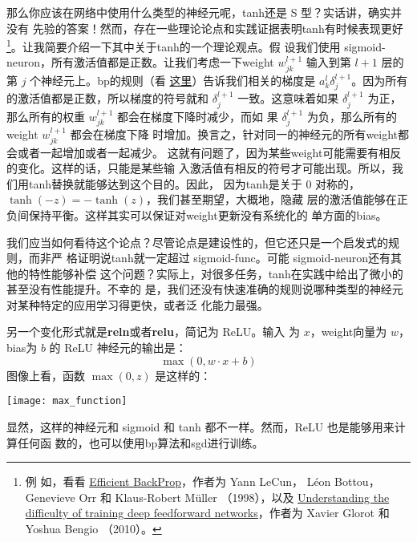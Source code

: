 那么你应该在网络中使用什么类型的神经元呢，\gls*{tanh}还是 S 型？实话讲，确实并没有
先验的答案！然而，存在一些理论论点和实践证据表明\gls*{tanh}有时候表现更好\footnote{例
  如，看看 \href{http://yann.lecun.com/exdb/publis/pdf/lecun-98b.pdf}{Efficient
    BackProp}，作者为 Yann LeCun， Léon Bottou， Genevieve Orr 和 Klaus-Robert
  Müller （1998），以及
  \href{http://jmlr.org/proceedings/papers/v9/glorot10a/glorot10a.pdf}{Understanding
    the difficulty of training deep feedforward networks}，作者为 Xavier Glorot
  和 Yoshua Bengio （2010）。}。让我简要介绍一下其中关于\gls*{tanh}的一个理论观点。假
设我们使用 \gls*{sigmoid-neuron}，所有激活值都是正数。让我们考虑一下\gls*{weight}
$w_{jk}^{l+1}$ 输入到第 $l+1$ 层的第 $j$ 个神经元上。\gls*{bp}的规则（看%
  \hyperref[eq:bp4]{这里}）告诉我们相关的梯度是 $a_k^l\delta_j^{l+1}$。因为所有
的激活值都是正数，所以梯度的符号就和 $\delta_j^{l+1}$ 一致。这意味着如果
$\delta_j^{l+1}$ 为正，那么所有的权重 $w_{jk}^{l+1}$ 都会在梯度下降时减少，而如
果 $\delta_j^{l+1}$ 为负，那么所有的\gls*{weight} $w_{jk}^{l+1}$ 都会在梯度下降
时增加。换言之，针对同一的神经元的所有\gls*{weight}都会或者一起增加或者一起减少。
这就有问题了，因为某些\gls*{weight}可能需要有相反的变化。这样的话，只能是某些输
入激活值有相反的符号才可能出现。所以，我们用\gls*{tanh}替换就能够达到这个目的。因此，
因为\gls*{tanh}是关于 $0$ 对称的，$\tanh(-z) = -\tanh(z)$，我们甚至期望，大概地，隐藏
层的激活值能够在正负间保持平衡。这样其实可以保证对\gls*{weight}更新没有系统化的
单方面的\gls*{bias}。

我们应当如何看待这个论点？尽管论点是建设性的，但它还只是一个启发式的规则，而非严
格证明说\gls*{tanh}就一定超过 \gls*{sigmoid-func}。可能 \gls*{sigmoid-neuron}还有其他的特性能够补偿
这个问题？实际上，对很多任务，\gls*{tanh}在实践中给出了微小的甚至没有性能提升。不幸的
是，我们还没有快速准确的规则说哪种类型的神经元对某种特定的应用学习得更快，或者泛
化能力最强。

另一个变化形式就是\textbf{\gls{reln}}或者\textbf{\gls{relu}}，简记为 ReLU。输入
为 $x$，\gls*{weight}向量为 $w$，\gls*{bias}为 $b$ 的 ReLU 神经元的输出是：
\begin{equation}
  \max(0, w \cdot x+b)
  \label{eq:112}\tag{112}
\end{equation}
图像上看，函数 $\max(0,z)$ 是这样的：
\begin{center}
  \texttt{[image: max\_function]}
\end{center}

显然，这样的神经元和 sigmoid 和 tanh 都不一样。然而，ReLU 也是能够用来计算任何函
数的，也可以使用\gls*{bp}算法和\gls*{sgd}进行训练。

